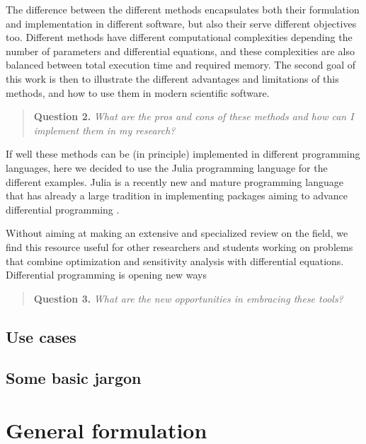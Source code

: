 The difference between the different methods encapsulates both their formulation and implementation in different software, but also their serve different objectives too. 
Different methods have different computational complexities depending the number of parameters and differential equations, and these complexities are also balanced between total execution time and required memory. 
The second goal of this work is then to illustrate the different advantages and limitations of this methods, and how to use them in modern scientific software. 
\begin{quote}
    \textbf{Question 2. }
    \textit{What are the pros and cons of these methods and how can I implement them in my research?}
\end{quote}
If well these methods can be (in principle) implemented in different programming languages, here we decided to use the Julia programming language for the different examples. 
Julia is a recently new and mature programming language that has already a large tradition in implementing packages aiming to advance differential programming \cite{Julialang_2017}. 

Without aiming at making an extensive and specialized review on the field, we find this resource useful for other researchers and students working on problems that combine optimization and sensitivity analysis with differential equations.
Differential programming is opening new ways  
\begin{quote}
    \textbf{Question 3. }
    \textit{What are the new opportunities in embracing these tools?}
\end{quote}

\subsection{Use cases}

\subsection{Some basic jargon}

\section{General formulation}

